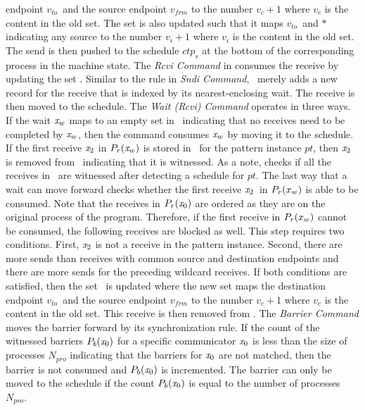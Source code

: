 endpoint $v_{to}$\ and the source endpoint $v_{frm}$ to the number $v_c + 1$ where $v_c$ is the content in the old set. The set is also updated such that it maps $v_{to}$\ and $\ast$ indicating any source to the number $v_i + 1$ where $v_i$ is the content in the old set. The send is then pushed to the schedule $\mathit{ctp}_s$ at the bottom of the corresponding process in the machine state. The \emph{Rcvi Command} in  consumes the receive by updating the set \epwait. Similar to the rule in \emph{Sndi Command}, \epwait\ merely adds a new record for the receive that is indexed by its nearest-enclosing wait. The receive is then moved to the schedule. The \emph{Wait (Rcvi) Command} operates in three ways. If the wait $\mathit{x}_w$ maps to an empty set in \epwait\ indicating that no receives need to be completed by $\mathit{x}_w$, then the command consumes $\mathit{x}_w$ by moving it to the schedule. If the first receive $\mathit{x}_2$ in $\textit{$P_r$}(\mathit{x}_w)$ is stored in \rcvp\ for the pattern instance $\mathit{pt}$, then $\mathit{x}_2$ is removed from \rcvp\ indicating that it is witnessed. As a note,  checks if all the receives in \rcvp\ are witnessed after detecting a schedule for $\mathit{pt}$. The last way that a wait can move forward checks whether the first receive $\mathit{x}_2$\ in $\textit{$P_r$}(x_w)$ is able to be consumed. Note that the receives in $\textit{$P_r$}(\mathit{x}_0)$ are ordered as they are on the original process of the program. Therefore, if the first receive in $\textit{$P_r$}(x_w)$ cannot be consumed, the following receives are blocked as well. This step requires two conditions. First, $\mathit{x}_2$ is not a receive in the pattern instance. Second, there are more sends than receives with common source and destination endpoints and there are more sends for the preceding wildcard receives. If both conditions are satisfied, then the set \eprcv\ is updated where the new set maps the destination endpoint $v_{to}$\ and the source endpoint $v_{frm}$ to the number $v_c + 1$ where $v_c$ is the content in the old set. This receive is then removed from \epwait. The \emph{Barrier Command} moves the barrier forward by its synchronization rule. If the count of the witnessed barriers $\textit{$P_b$}(\mathit{x}_0)$ for a specific communicator $\mathit{x}_0$ is less than the size of processes $N_{pro}$ indicating that the barriers for $\mathit{x}_0$ are not matched, then the barrier is not consumed and $\textit{$P_b$}(\mathit{x}_0)$ is incremented. The barrier can only be moved to the schedule if the count $\textit{$P_b$}(\mathit{x}_0)$ is equal to the number of processes $N_{pro}$.

